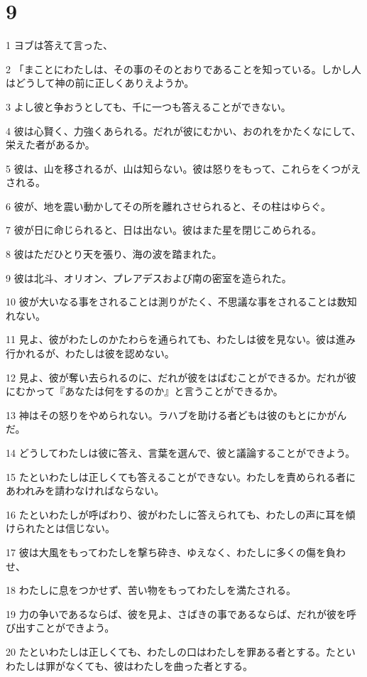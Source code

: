 \chapter{9}

\par 1 ヨブは答えて言った、
\par 2 「まことにわたしは、その事のそのとおりであることを知っている。しかし人はどうして神の前に正しくありえようか。
\par 3 よし彼と争おうとしても、千に一つも答えることができない。
\par 4 彼は心賢く、力強くあられる。だれが彼にむかい、おのれをかたくなにして、栄えた者があるか。
\par 5 彼は、山を移されるが、山は知らない。彼は怒りをもって、これらをくつがえされる。
\par 6 彼が、地を震い動かしてその所を離れさせられると、その柱はゆらぐ。
\par 7 彼が日に命じられると、日は出ない。彼はまた星を閉じこめられる。
\par 8 彼はただひとり天を張り、海の波を踏まれた。
\par 9 彼は北斗、オリオン、プレアデスおよび南の密室を造られた。
\par 10 彼が大いなる事をされることは測りがたく、不思議な事をされることは数知れない。
\par 11 見よ、彼がわたしのかたわらを通られても、わたしは彼を見ない。彼は進み行かれるが、わたしは彼を認めない。
\par 12 見よ、彼が奪い去られるのに、だれが彼をはばむことができるか。だれが彼にむかって『あなたは何をするのか』と言うことができるか。
\par 13 神はその怒りをやめられない。ラハブを助ける者どもは彼のもとにかがんだ。
\par 14 どうしてわたしは彼に答え、言葉を選んで、彼と議論することができよう。
\par 15 たといわたしは正しくても答えることができない。わたしを責められる者にあわれみを請わなければならない。
\par 16 たといわたしが呼ばわり、彼がわたしに答えられても、わたしの声に耳を傾けられたとは信じない。
\par 17 彼は大風をもってわたしを撃ち砕き、ゆえなく、わたしに多くの傷を負わせ、
\par 18 わたしに息をつかせず、苦い物をもってわたしを満たされる。
\par 19 力の争いであるならば、彼を見よ、さばきの事であるならば、だれが彼を呼び出すことができよう。
\par 20 たといわたしは正しくても、わたしの口はわたしを罪ある者とする。たといわたしは罪がなくても、彼はわたしを曲った者とする。
